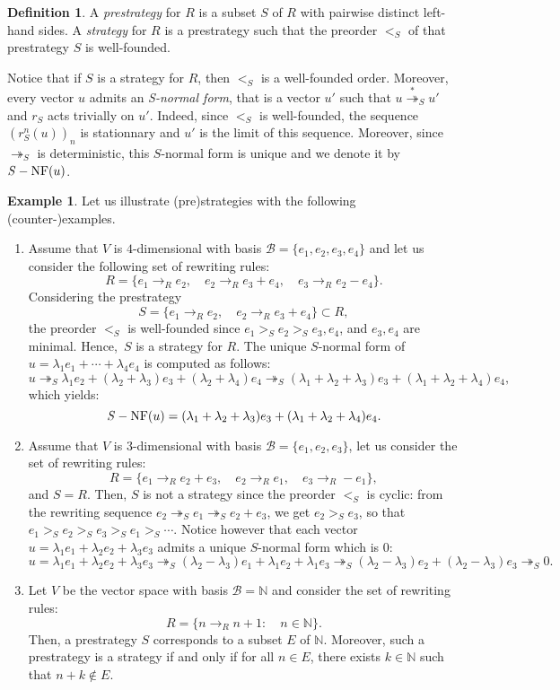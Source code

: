 \documentclass[11pt]{article}
\theoremstyle{definition}
\newtheorem{definition}[theorem]{Definition}
\newtheorem{example}[theorem]{Example}
\newcommand\basis{\mathscr{B}}
\newcommand\ordS{<_S}
\newcommand\N{\mathbb{N}}
\newcommand\rewR{\to_R}
\newcommand\parS{\twoheadrightarrow_S}
\newcommand\transS{\overset{*}{\twoheadrightarrow}_S}
\DeclareMathOperator{\SNF}{{\it S}-NF}
\begin{document}
\begin{definition}\label{def:strategies}
  A {\em prestrategy} for $R$ is a subset $S$ of $R$ with pairwise
  distinct left-hand sides. A {\em strategy} for $R$ is a prestrategy
  such that the preorder $\ordS$ of that prestrategy $S$ is well-founded. 
\end{definition}
\smallskip

Notice that if $S$ is a strategy for $R$, then $\ordS$ is a well-founded
order. Moreover, every vector $u$ admits an {\em S-normal form}, that is
a vector $u'$ such that $u\transS u'$ and $r_S$ acts trivially on $u'$.
Indeed, since $\ordS$ is well-founded, the sequence $(r_S^n(u))_n$ is
stationnary and $u'$ is the limit of this sequence. Moreover, since
$\parS$ is deterministic, this $S$-normal form is unique and we denote it
by~$\SNF(u)$. 
\smallskip

\begin{example}\label{ex:strategies_step_1}
  Let us illustrate (pre)strategies with the following
  (counter-)examples.
  \begin{enumerate}
  \item\label{it:ex_strat_1} Assume that $V$ is $4$-dimensional with
    basis $\basis=\{e_1,e_2,e_3,e_4\}$ and let us consider the following
    set of rewriting rules:
    \[R=\{e_1\rewR e_2,\quad e_2\rewR e_3+e_4,\quad e_3\rewR e_2-e_4\}.\]
    Considering the prestrategy
    \[S=\{e_1\rewR e_2,\quad e_2\rewR e_3+e_4\}\subset R,\]
    the preorder $\ordS$ is well-founded since $e_1>_Se_2>_Se_3,e_4$, and
    $e_3,e_4$ are minimal. Hence,~$S$ is a strategy for $R$. The unique
    $S$-normal form of $u=\lambda_1e_1+\cdots+\lambda_4e_4$ is computed
    as follows:
    \[u\parS\lambda_1e_2+(\lambda_2+\lambda_3)e_3+
    (\lambda_2+\lambda_4)e_4\parS(\lambda_1+\lambda_2+\lambda_3)e_3+
    (\lambda_1+\lambda_2+\lambda_4)e_4,\]
    which yields:
    \[\SNF(u)=(\lambda_1+\lambda_2+\lambda_3)e_3+
    (\lambda_1+\lambda_2+\lambda_4)e_4.\]
  \item\label{it:c-ex_strat_1} Assume that $V$ is $3$-dimensional with
    basis $\basis=\{e_1,e_2,e_3\}$, let us consider the set of rewriting
    rules:
    \[R=\{e_1\rewR e_2+e_3,\quad e_2\rewR e_1,\quad e_3\rewR -e_1\},\]
    and $S=R$. Then, $S$ is not a strategy since the preorder $\ordS$ is
    cyclic: from the rewriting sequence $e_2\parS e_1\parS e_2+e_3$, we
    get $e_2>_Se_3$, so that $e_1>_S e_2>_S e_3>_S e_1>_S\cdots$. Notice
    however that each vector $u=\lambda_1e_1+\lambda_2e_2+\lambda_3e_3$
    admits a unique $S$-normal form which is $0$:
    \[u=\lambda_1e_1+\lambda_2e_2+\lambda_3e_3\parS(\lambda_2-\lambda_3)
    e_1+\lambda_1e_2+\lambda_1e_3\parS(\lambda_2-\lambda_3)e_2+(\lambda_2-
    \lambda_3)e_3\parS 0.
    \]
  \item\label{it:case_N} Let $V$ be the vector space with basis
    $\basis= \mathbb N$ and consider the set of rewriting rules:
    \[R=\{n\rewR n+1:\quad n\in\N\}.\]
    Then, a prestrategy $S$ corresponds to a subset $E$ of $\mathbb N$.
    Moreover, such a prestrategy is a strategy if and only if for all
    $n\in E$, there exists $k\in \mathbb N$ such that $n + k \notin E$. 
  \end{enumerate}
\end{example}
\smallskip
\end{document}
